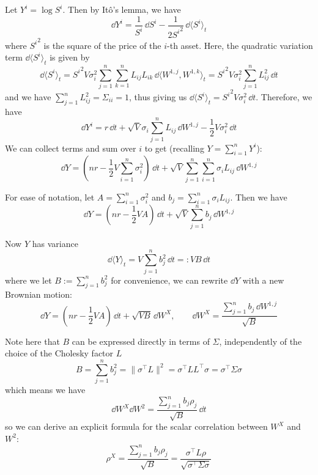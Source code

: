 Let $Y^i = \log S^i$. Then by Itô's lemma, we have
\begin{equation}
    \dd Y^i = \frac 1{S^i} \,\dd S^i - \frac 1{2{S^i}^2} \,\dd \langle S^i\rangle_t
\end{equation}
where ${S^i}^2$ is the square of the price of the $i$-th asset. Here, the quadratic variation term $\dd \langle S^i\rangle_t$ is given by
\begin{equation}
    \dd \langle S^i\rangle_t = {S^i}^2 V \sigma_i^2 \sum_{j=1}^n\sum_{k=1}^n L_{ij}L_{ik} \,\dd \langle W^{1, j}, W^{1, k}\rangle_t = {S^i}^2 V \sigma_i^2 \sum_{j=1}^n L_{ij}^2 \,\dd t
\end{equation}
and we have $\sum_{j=1}^n L_{ij}^2 = \Sigma_{ii} = 1$, thus giving us $\dd \langle S^i\rangle_t = {S^i}^2 V \sigma_i^2 \,\dd t$. Therefore, we have
\begin{equation}
    \dd Y^i = r\,\dd t + \sqrt V\sigma_i \sum_{j=1}^n L_{ij}\,\dd W^{1, j} - \frac 12 V \sigma_i^2 \,\dd t
\end{equation}
We can collect terms and sum over $i$ to get (recalling $Y = \sum_{i=1}^n Y^i$):
\begin{equation}
    \dd Y = \left (nr - \frac 12 V \sum_{i=1}^n \sigma_i^2\right) \,\dd t + \sqrt V \sum_{j=1}^n\sum_{i=1}^n \sigma_i L_{ij} \,\dd W^{1, j}
\end{equation}

For ease of notation, let $A=\sum_{i=1}^n \sigma_i^2$ and $b_j = \sum_{i=1}^n\sigma_i L_{ij}$. Then we have
\begin{equation}
    \dd Y = \left(nr - \frac 12 VA\right) \,\dd t + \sqrt V \sum_{j=1}^n b_j \,\dd W^{1, j}
\end{equation}

Now $Y$ has variance
\begin{equation}
    \dd \langle Y\rangle_t = V\sum_{j=1}^n b_j^2 \,\dd t =: VB\,\dd t
\end{equation}
where we let $B := \sum_{j=1}^n b_j^2$ for convenience, we can rewrite $\dd Y$ with a new Brownian motion:
\begin{equation}
    \dd Y = \left(nr - \frac 12 VA\right)\,\dd t + \sqrt {VB} \,\dd W^X, \qquad \dd W^X = \frac{\sum_{j=1}^n b_j \,\dd W^{1, j}}{\sqrt B}
\end{equation}

Note here that $B$ can be expressed directly in terms of $\Sigma$, independently of the choice of the Cholesky factor $L$
\begin{equation}
    B = \sum_{j=1}^n b_j^2 = \|\sigma^\top L\|^2 = \sigma^\top LL^\top \sigma = \sigma^\top \Sigma \sigma
\end{equation}
which means we have
\begin{equation}
    \dd W^X \dd W^2 = \frac{\sum_{j=1}^{n}b_j\rho_j}{\sqrt B}\,\dd t
\end{equation}
so we can derive an explicit formula for the scalar correlation between $W^X$ and $W^2$:
\begin{equation}
    \rho^X = \frac{\sum_{j=1}^n b_j \rho_j}{\sqrt B} = \frac{\sigma^\top L\rho}{\sqrt{\sigma^\top \Sigma \sigma}}
\end{equation}

